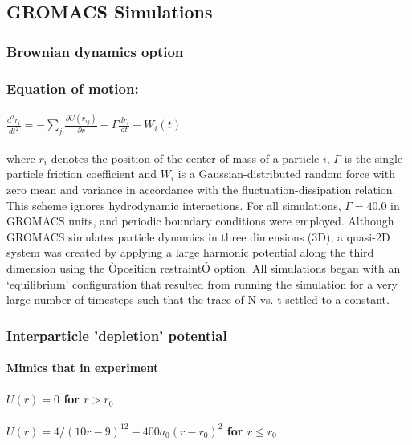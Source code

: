 \documentclass{umthesis}
\begin{document}
\subsection{GROMACS Simulations}
\label{sec-1.3.3}
\subsubsection{Brownian dynamics option}
\label{sec-1.3.3.1}
\subsubsection{Equation of motion:}
\label{sec-1.3.3.2}
\paragraph{$\frac{d^2 r_i}{dt^2}  = - \sum_j \frac{\partial{U(r_{ij})}}{{\partial r}}  - \Gamma  \frac{d r_i}{dt} + W_i (t)$}
\label{sec-1.3.3.2.1}

where $r_i$ denotes the position of the center of mass of a particle $i$, $\Gamma$ is the single-particle friction coefficient and $W_i$ is a Gaussian-distributed random force with zero mean and variance in accordance with the fluctuation-dissipation relation.  This scheme ignores hydrodynamic interactions. For all simulations, $\Gamma=40.0$ in GROMACS units, and periodic boundary conditions were employed. Although GROMACS simulates particle dynamics in three dimensions (3D), a quasi-2D system was created by applying a large harmonic potential along the third dimension using the Òposition restraintÓ option. All simulations began with an `equilibrium' configuration that resulted from running the simulation for a very large number of timesteps such that the trace of N vs. t settled to a constant.
\subsubsection{Interparticle 'depletion' potential}
\label{sec-1.3.3.3}
\paragraph{Mimics that in experiment}
\label{sec-1.3.3.3.1}
\paragraph{$U(r)=0$ for $r > r_0$}
\label{sec-1.3.3.3.2}
\paragraph{$U(r)=4/(10r-9)^{12} -  400 a_0 (r-r_0)^2$ for $r \le r_0$}
\label{sec-1.3.3.3.3}
\end{document}
